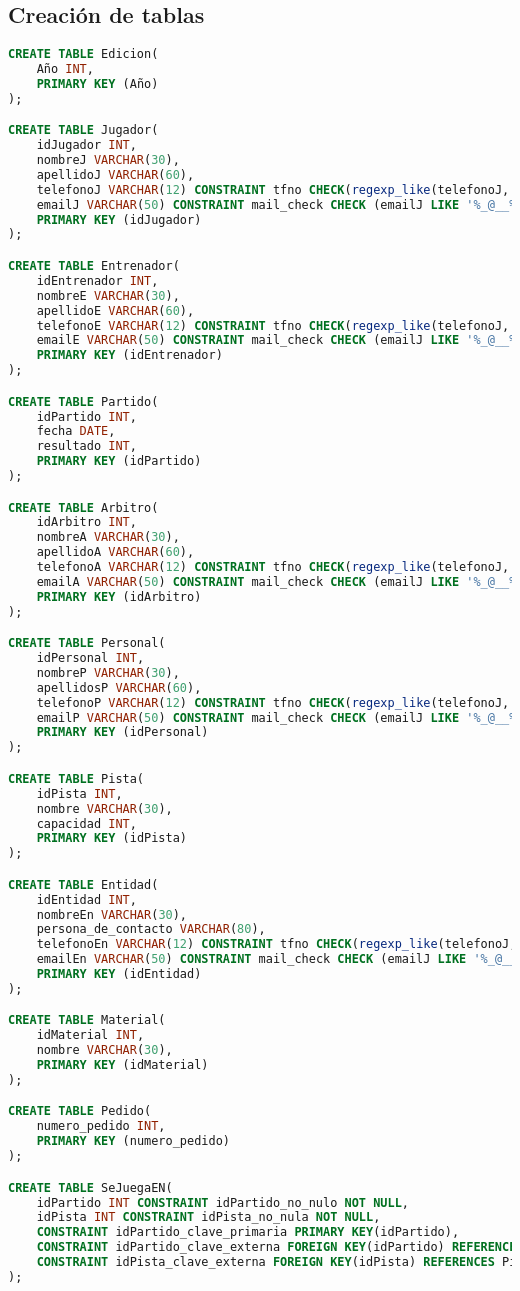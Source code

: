 \subsection{Creación de tablas}
\begin{lstlisting}[language=sql]
CREATE TABLE Edicion(
	Año INT,
	PRIMARY KEY (Año)
);

CREATE TABLE Jugador(
	idJugador INT,
	nombreJ VARCHAR(30),
	apellidoJ VARCHAR(60),
	telefonoJ VARCHAR(12) CONSTRAINT tfno CHECK(regexp_like(telefonoJ,'\+?[0-9]')),
	emailJ VARCHAR(50) CONSTRAINT mail_check CHECK (emailJ LIKE '%_@__%.__%'),
	PRIMARY KEY (idJugador)
);

CREATE TABLE Entrenador(
	idEntrenador INT,
	nombreE VARCHAR(30),
	apellidoE VARCHAR(60),
	telefonoE VARCHAR(12) CONSTRAINT tfno CHECK(regexp_like(telefonoJ,'\+?[0-9]')),
	emailE VARCHAR(50) CONSTRAINT mail_check CHECK (emailJ LIKE '%_@__%.__%'),
	PRIMARY KEY (idEntrenador)
);

CREATE TABLE Partido(
	idPartido INT,
	fecha DATE,
	resultado INT,
	PRIMARY KEY (idPartido)
);

CREATE TABLE Arbitro(
	idArbitro INT,
	nombreA VARCHAR(30),
	apellidoA VARCHAR(60),
	telefonoA VARCHAR(12) CONSTRAINT tfno CHECK(regexp_like(telefonoJ,'\+?[0-9]')),
	emailA VARCHAR(50) CONSTRAINT mail_check CHECK (emailJ LIKE '%_@__%.__%'),
	PRIMARY KEY (idArbitro)
);

CREATE TABLE Personal(
	idPersonal INT,
	nombreP VARCHAR(30),
	apellidosP VARCHAR(60),
	telefonoP VARCHAR(12) CONSTRAINT tfno CHECK(regexp_like(telefonoJ,'\+?[0-9]')),
	emailP VARCHAR(50) CONSTRAINT mail_check CHECK (emailJ LIKE '%_@__%.__%'),
	PRIMARY KEY (idPersonal)
);

CREATE TABLE Pista(
	idPista INT,
	nombre VARCHAR(30),
	capacidad INT,
	PRIMARY KEY (idPista)
);

CREATE TABLE Entidad(
	idEntidad INT,
	nombreEn VARCHAR(30),
	persona_de_contacto VARCHAR(80),
	telefonoEn VARCHAR(12) CONSTRAINT tfno CHECK(regexp_like(telefonoJ,'\+?[0-9]')),
	emailEn VARCHAR(50) CONSTRAINT mail_check CHECK (emailJ LIKE '%_@__%.__%'),
	PRIMARY KEY (idEntidad)
);

CREATE TABLE Material(
	idMaterial INT,
	nombre VARCHAR(30),
	PRIMARY KEY (idMaterial)
);

CREATE TABLE Pedido(
	numero_pedido INT,
	PRIMARY KEY (numero_pedido)
);

CREATE TABLE SeJuegaEN(
	idPartido INT CONSTRAINT idPartido_no_nulo NOT NULL,
	idPista INT CONSTRAINT idPista_no_nula NOT NULL,
	CONSTRAINT idPartido_clave_primaria PRIMARY KEY(idPartido),
	CONSTRAINT idPartido_clave_externa FOREIGN KEY(idPartido) REFERENCES Partido(idPartido),
	CONSTRAINT idPista_clave_externa FOREIGN KEY(idPista) REFERENCES Pista(idPista)
);


\end{lstlisting}
